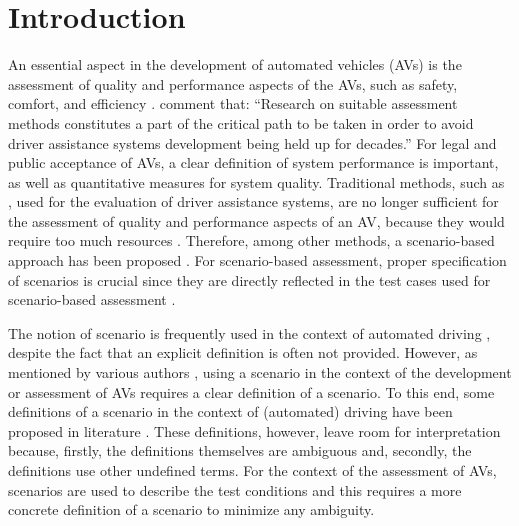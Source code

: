 \section{Introduction}
\label{sec:introduction}

An essential aspect in the development of automated vehicles (AVs) is the assessment of quality and performance aspects of the AVs, such as safety, comfort, and efficiency \cite{bengler2014threedecades, stellet2015taxonomy, Helmer2017safety, putz2017pegasus, roesener2017comprehensive, gietelink2006development, roesener2016scenariobased, wachenfeld2016release}.
\cbstartd
\textcite{bengler2014threedecades} comment that: ``Research on suitable assessment methods constitutes a part of the critical path to be taken in order to avoid driver assistance systems development being held up for decades.''
\cbend
For legal and public acceptance of AVs, a clear definition of system performance is important, as well as quantitative measures for system quality. 
Traditional methods, such as \cite{response2006code, ISO26262}, used for the evaluation of driver assistance systems, are no longer sufficient for the assessment of quality and performance aspects of an AV, because they would require too much resources \cite{wachenfeld2016release}. 
Therefore, among other methods, a scenario-based approach has been proposed \cite{roesener2016scenariobased, putz2017pegasus}. 
For scenario-based assessment, proper specification of scenarios is crucial since they are directly reflected in the test cases used for scenario-based assessment \cite{stellet2015taxonomy}. 

The notion of scenario is frequently used in the context of automated driving \cite{putz2017pegasus, roesener2017comprehensive, gietelink2006development, hulshof2013autonomous, karaduman2013interactivebehavior, englund2016grand, xu2002effects, ebner2011identifying, ploeg2017GCDC, zofka2015datadrivetrafficscenarios}, despite the fact that an explicit definition is often not provided. 
However, as mentioned by various authors \cite{stellet2015taxonomy, Helmer2017safety, alvarez2017prospective, zofka2015datadrivetrafficscenarios, aparicio2013pre, lesemann2011test, putz2017pegasus, geyer2014, ulbrich2015}, using a scenario in the context of the development or assessment of AVs requires a clear definition of a scenario. 
To this end, some definitions of a scenario in the context of (automated) driving have been proposed in literature \cite{geyer2014, ulbrich2015, elrofai2016scenario}.
\cbstart
These definitions, however, leave room for interpretation because, firstly, the definitions themselves are ambiguous and, secondly, the definitions use other undefined terms.
For the context of the assessment of AVs, scenarios are used to describe the test conditions \cite{stellet2015taxonomy} and this requires a more concrete definition of a scenario to minimize any ambiguity.
\cbend

